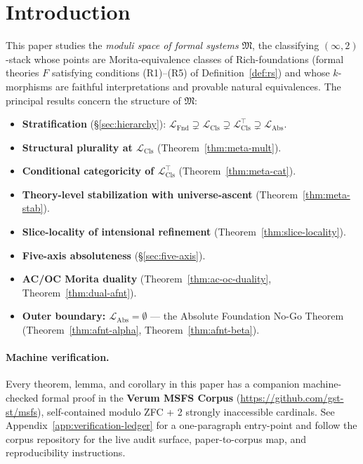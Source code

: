 \documentclass[11pt]{article}
\theoremstyle{plain}
\theoremstyle{definition}
\newcommand{\fM}{\mathfrak{M}}
\newcommand{\LFnd}{\mathcal{L}_{\mathrm{Fnd}}}
\newcommand{\LCls}{\mathcal{L}_{\mathrm{Cls}}}
\newcommand{\LClsMax}{\mathcal{L}_{\mathrm{Cls}}^{\top}}
\newcommand{\LAbs}{\mathcal{L}_{\mathrm{Abs}}}
\begin{document}
\begin{abstract}
\smallskip
\noindent\textbf{Keywords:} moduli space of formal systems, classifying $2$-stacks, categorical logic, $(\infty, n)$-categories, higher topos theory, intensional type theory, meta-classification, effective topos, no-go theorems.

\smallskip
\noindent\textbf{MSC2020:} 03A05, 03B30, 03C45, 03F40, 18A05, 18N10, 18N50, 18N60, 18N65.

\end{abstract}

\newpage
\tableofcontents
\newpage

\section{Introduction}

This paper studies the \emph{moduli space of formal systems} $\fM$, the classifying $(\infty, 2)$-stack whose points are Morita-equivalence classes of Rich-foundations (formal theories $F$ satisfying conditions (R1)--(R5) of Definition~\ref{def:rs}) and whose $k$-morphisms are faithful interpretations and provable natural equivalences. The principal results concern the structure of $\fM$:
\begin{itemize}
\item \textbf{Stratification} (\S\ref{sec:hierarchy}): $\LFnd \supsetneq \LCls \supsetneq \LClsMax \supsetneq \LAbs$.
\item \textbf{Structural plurality at $\LCls$} (Theorem~\ref{thm:meta-mult}).
\item \textbf{Conditional categoricity of $\LClsMax$} (Theorem~\ref{thm:meta-cat}).
\item \textbf{Theory-level stabilization with universe-ascent} (Theorem~\ref{thm:meta-stab}).
\item \textbf{Slice-locality of intensional refinement} (Theorem~\ref{thm:slice-locality}).
\item \textbf{Five-axis absoluteness} (\S\ref{sec:five-axis}).
\item \textbf{AC/OC Morita duality} (Theorem~\ref{thm:ac-oc-duality}, Theorem~\ref{thm:dual-afnt}).
\item \textbf{Outer boundary: $\LAbs = \emptyset$} --- the Absolute Foundation No-Go Theorem (Theorem~\ref{thm:afnt-alpha}, Theorem~\ref{thm:afnt-beta}).
\end{itemize}

\paragraph{Machine verification.}  Every theorem, lemma, and corollary in this paper has a companion machine-checked formal proof in the \textbf{Verum MSFS Corpus} (\url{https://github.com/gst-st/msfs}), self-contained modulo ZFC + 2 strongly inaccessible cardinals.  See Appendix~\ref{app:verification-ledger} for a one-paragraph entry-point and follow the corpus repository for the live audit surface, paper-to-corpus map, and reproducibility instructions.
\end{document}
